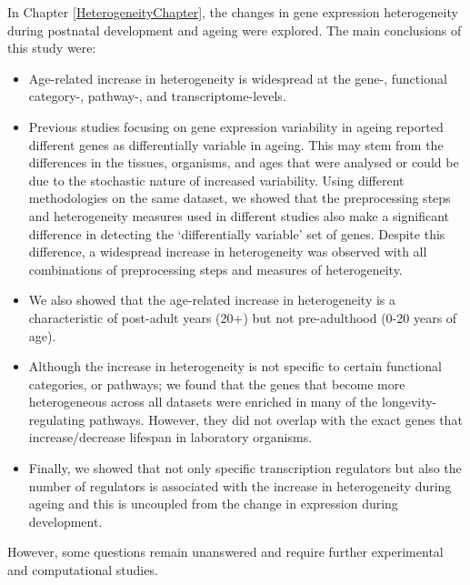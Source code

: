 \documentclass[12pt,twoside]{unicam}
\providecommand{\tightlist}{%
  \setlength{\itemsep}{0pt}\setlength{\parskip}{0pt}}
\begin{document}
In Chapter \ref{HeterogeneityChapter}, the changes in gene expression heterogeneity during postnatal development and ageing were explored. The main conclusions of this study were:

\begin{itemize}
\tightlist
\item
  Age-related increase in heterogeneity is widespread at the gene-, functional category-, pathway-, and transcriptome-levels.
\item
  Previous studies focusing on gene expression variability in ageing reported different genes as differentially variable in ageing. This may stem from the differences in the tissues, organisms, and ages that were analysed or could be due to the stochastic nature of increased variability. Using different methodologies on the same dataset, we showed that the preprocessing steps and heterogeneity measures used in different studies also make a significant difference in detecting the `differentially variable' set of genes. Despite this difference, a widespread increase in heterogeneity was observed with all combinations of preprocessing steps and measures of heterogeneity.
\item
  We also showed that the age-related increase in heterogeneity is a characteristic of post-adult years (20+) but not pre-adulthood (0-20 years of age).
\item
  Although the increase in heterogeneity is not specific to certain functional categories, or pathways; we found that the genes that become more heterogeneous across all datasets were enriched in many of the longevity-regulating pathways. However, they did not overlap with the exact genes that increase/decrease lifespan in laboratory organisms.
\item
  Finally, we showed that not only specific transcription regulators but also the number of regulators is associated with the increase in heterogeneity during ageing and this is uncoupled from the change in expression during development.
\end{itemize}

However, some questions remain unanswered and require further experimental and computational studies.
\end{document}
